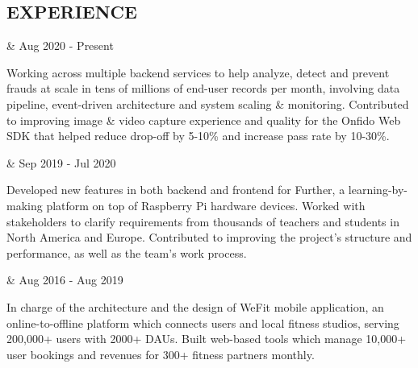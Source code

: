\subsection*{EXPERIENCE}

\begin{workexp}
   \at \href{https://onfido.com/}{}  &
  Aug 2020 - Present
\end{workexp}

\tbullet Working across multiple backend services to help analyze, detect and prevent frauds at scale in tens of millions of end-user records per month, involving data pipeline, event-driven architecture and system scaling \& monitoring. \newline
\tbullet Contributed to improving image \& video capture experience and quality for the Onfido Web SDK that helped reduce drop-off by 5-10\% and increase pass rate by 10-30\%. \newline

\begin{workexp}
   \at \href{https://www.pi-top.com/}{}  &
  Sep 2019 - Jul 2020 
\end{workexp}

\tbullet Developed new features in both backend and frontend for Further, a learning-by-making platform on top of Raspberry Pi hardware devices. \newline
\tbullet Worked with stakeholders to clarify requirements from thousands of teachers and students in North America and Europe. \newline
\tbullet Contributed to improving the project's structure and performance, as well as the team's work process. \newline

\begin{workexp}
   \at \href{https://youtu.be/_FhxbwNqGS8}{}  &
  Aug 2016 - Aug 2019 
\end{workexp}

\tbullet In charge of the architecture and the design of WeFit mobile application, an online-to-offline platform which connects users and local fitness studios, serving 200,000+ users with 2000+ DAUs. \newline
\tbullet Built web-based tools which manage 10,000+ user bookings and revenues for 300+ fitness partners monthly. \newline

